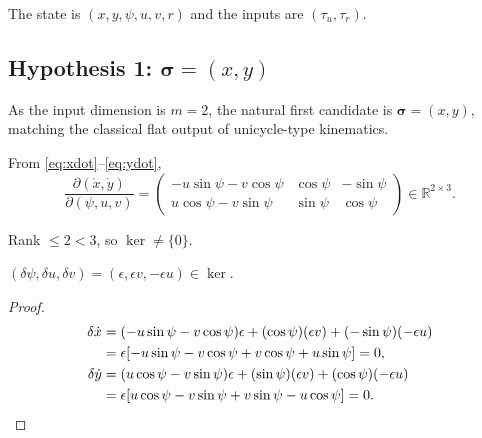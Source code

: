 The state is $(x,y,\psi,u,v,r)$ and the inputs are $(\tau_u,\tau_r)$.

\subsection{Hypothesis 1: $\bm\sigma=(x,y)$}

As the input dimension is $m=2$, the natural first candidate is $\bm\sigma=(x,y)$, matching the classical flat output of unicycle-type kinematics.

From \eqref{eq:xdot}--\eqref{eq:ydot},
\begin{equation}
\frac{\partial(\dot x,\dot y)}{\partial(\psi,u,v)}=
\begin{pmatrix}
-u\sin\psi-v\cos\psi & \cos\psi & -\sin\psi\\
u\cos\psi-v\sin\psi & \sin\psi & \cos\psi
\end{pmatrix} \in \mathbb{R}^{2\times3}.
\end{equation}

Rank $\leq 2 < 3$, so $\ker\neq\{0\}$.

\begin{proposition}
$(\delta\psi,\delta u,\delta v)=(\epsilon,\epsilon v,-\epsilon u)\in\ker$.
\end{proposition}
\begin{proof}
\begin{align}
\delta\dot x &= (-u\sin\psi-v\cos\psi)\epsilon+(\cos\psi)(\epsilon v)+(-\sin\psi)(-\epsilon u)\notag\\
&=\epsilon[-u\sin\psi-v\cos\psi+v\cos\psi+u\sin\psi]=0,\\
\delta\dot y &= (u\cos\psi-v\sin\psi)\epsilon+(\sin\psi)(\epsilon v)+(\cos\psi)(-\epsilon u)\notag\\
&=\epsilon[u\cos\psi-v\sin\psi+v\sin\psi-u\cos\psi]=0.
\end{align}
\end{proof}


